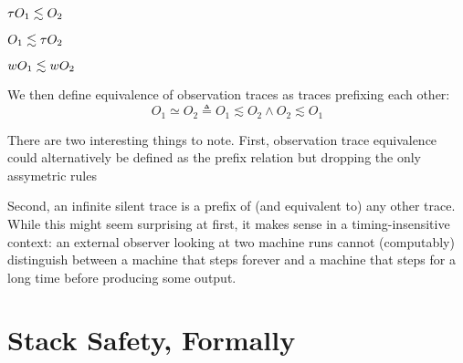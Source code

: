 \documentclass[acmsmall,review,anonymous]{acmart}\settopmatter{printfolios=true,printccs=false,printacmref=false}
\begin{document}
\judgment{}{\(\obsT \lesssim \obsT\)}

\judgment{}{\(\tau \lesssim \obsT\)}

         {\(\tau O_1 \lesssim O_2\)}

         {\(O_1 \lesssim \tau O_2\)}

         {\(wO_1 \lesssim wO_2\)}


We then define equivalence of observation traces as traces prefixing each other:
\[O_1 \simeq O_2 \triangleq O_1 \lesssim O_2 \land O_2 \lesssim O_1\]

 There are two interesting things
to note.  First, observation trace equivalence could alternatively be
defined as the prefix relation but dropping the only assymetric rules

Second, an infinite silent trace is a prefix of (and equivalent to)
any other trace. While this might seem surprising at first, it makes
sense in a timing-insensitive context: an external observer looking
at two machine runs cannot (computably) distinguish between a machine that
steps forever and a machine that steps for a long time before producing
some output.

%
%

\section{Stack Safety, Formally}
\label{sec:lse-and-wbcf}
\end{document}
